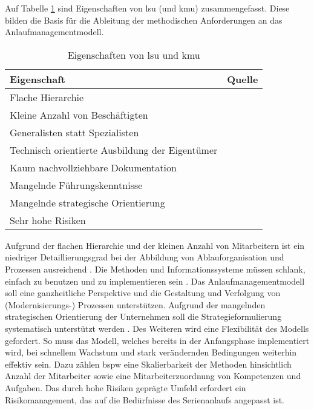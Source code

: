 Auf Tabelle \ref{tab:eigenschaften_lsu} sind Eigenschaften von \gls{lsu} (und \gls{kmu}) zusammengefasst. Diese bilden die Basis für die Ableitung der methodischen Anforderungen an das Anlaufmanagementmodell. 
\begin{table}[h]
\caption{Eigenschaften von \gls{lsu} und \gls{kmu}} \label{tab:eigenschaften_lsu} 
\begin{center}
\begin{tabular}{l l}
\textbf{Eigenschaft} & \textbf{Quelle }\\ \hline
Flache Hierarchie & \cite[10]{Dombrowski2009a} \\ 
Kleine Anzahl von Beschäftigten & \cite[9]{Dombrowski2009a} \\
Generalisten statt Spezialisten & \cite[9]{Dombrowski2009a}\\
Technisch orientierte Ausbildung der Eigentümer & \cite[47]{Dombrowski2009a}\\
Kaum nachvollziehbare Dokumentation & \cite[1]{Zimolong2006} \\
Mangelnde Führungskenntnisse & \cite[47]{Dombrowski2009a}\\
Mangelnde strategische Orientierung & \cite[48]{Dombrowski2009a}\\
Sehr hohe Risiken & \cite[9]{Ries2011}\\
 \end{tabular} 
 \end{center}
\end{table}

Aufgrund der flachen Hierarchie und der kleinen Anzahl von Mitarbeitern ist ein niedriger Detaillierungsgrad bei der Abbildung von Ablauforganisation und Prozessen ausreichend \cite[151]{Dombrowski2009a}. 
Die Methoden und Informationssysteme müssen schlank, einfach zu benutzen und zu implementieren sein \cite[4]{Zimolong2007}. 
Das Anlaufmanagementmodell soll eine ganzheitliche Perspektive und die Gestaltung und Verfolgung von (Modernisierungs-) Prozessen unterstützen. Aufgrund der mangelnden strategischen Orientierung der Unternehmen soll die Strategieformulierung systematisch unterstützt werden \cite[47-48]{Dombrowski2009a}.
Des Weiteren wird eine Flexibilität des Modells gefordert. So muss das Modell, welches bereits in der Anfangsphase implementiert wird, bei schnellem Wachstum und stark verändernden Bedingungen weiterhin effektiv sein. Dazu zählen \gls{bspw} eine Skalierbarkeit der Methoden hinsichtlich Anzahl der Mitarbeiter sowie eine Mitarbeiterzuordnung von Kompetenzen und Aufgaben. 
Das durch hohe Risiken geprägte Umfeld erfordert ein Risikomanagement, das auf die Bedürfnisse des Serienanlaufs angepasst ist. 


